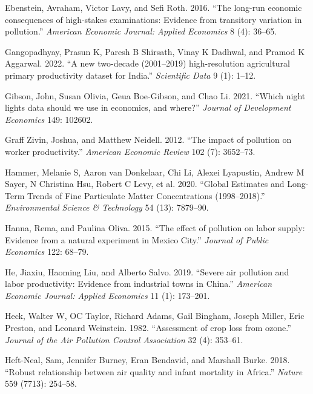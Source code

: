 \documentclass[
]{article}
\newlength{\cslhangindent}
\newlength{\cslentryspacingunit} %
\newenvironment{CSLReferences}[2] %
 {%
  \setlength{\parindent}{0pt}
  \ifodd #1
  \let\oldpar\par
  \def\par{\hangindent=\cslhangindent\oldpar}
  \fi
  \setlength{\parskip}{#2\cslentryspacingunit}
 }%
 {}
\begin{document}
\begin{CSLReferences}{1}{0}
\leavevmode{}%
Ebenstein, Avraham, Victor Lavy, and Sefi Roth. 2016. {``{The long-run economic consequences of high-stakes examinations: Evidence from transitory variation in pollution}.''} \emph{{American Economic Journal: Applied Economics}} 8 (4): 36--65.

\leavevmode{}%
Gangopadhyay, Prasun K, Paresh B Shirsath, Vinay K Dadhwal, and Pramod K Aggarwal. 2022. {``{A new two-decade (2001--2019) high-resolution agricultural primary productivity dataset for India}.''} \emph{{Scientific Data}} 9 (1): 1--12.

\leavevmode{}%
Gibson, John, Susan Olivia, Geua Boe-Gibson, and Chao Li. 2021. {``{Which night lights data should we use in economics, and where?}''} \emph{{Journal of Development Economics}} 149: 102602.

\leavevmode{}%
Graff Zivin, Joshua, and Matthew Neidell. 2012. {``{The impact of pollution on worker productivity}.''} \emph{{American Economic Review}} 102 (7): 3652--73.

\leavevmode{}%
Hammer, Melanie S, Aaron van Donkelaar, Chi Li, Alexei Lyapustin, Andrew M Sayer, N Christina Hsu, Robert C Levy, et al. 2020. {``Global Estimates and Long-Term Trends of Fine Particulate Matter Concentrations (1998--2018).''} \emph{{Environmental Science \& Technology}} 54 (13): 7879--90.

\leavevmode{}%
Hanna, Rema, and Paulina Oliva. 2015. {``{The effect of pollution on labor supply: Evidence from a natural experiment in Mexico City}.''} \emph{{Journal of Public Economics}} 122: 68--79.

\leavevmode{}%
He, Jiaxiu, Haoming Liu, and Alberto Salvo. 2019. {``{Severe air pollution and labor productivity: Evidence from industrial towns in China}.''} \emph{{American Economic Journal: Applied Economics}} 11 (1): 173--201.

\leavevmode{}%
Heck, Walter W, OC Taylor, Richard Adams, Gail Bingham, Joseph Miller, Eric Preston, and Leonard Weinstein. 1982. {``{Assessment of crop loss from ozone}.''} \emph{{Journal of the Air Pollution Control Association}} 32 (4): 353--61.

\leavevmode{}%
Heft-Neal, Sam, Jennifer Burney, Eran Bendavid, and Marshall Burke. 2018. {``{Robust relationship between air quality and infant mortality in Africa}.''} \emph{Nature} 559 (7713): 254--58.


\end{CSLReferences}
\end{document}
